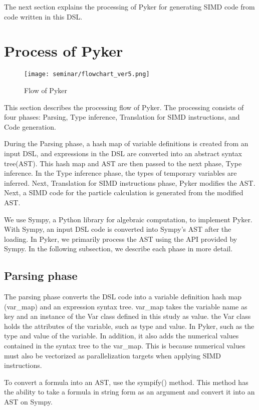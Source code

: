 \documentclass[ams]{article}
\begin{document}
The next section explains the processing of Pyker for generating SIMD code from code written in this DSL.


\section{Process of Pyker}


\begin{figure}[htbp]
\centering
\texttt{[image: seminar/flowchart\_ver5.png]}
\caption{Flow of Pyker}
\label{fig:flowchart}
\end{figure}

This section describes the processing flow of Pyker. The processing consists of four phases: Parsing, Type inference, Translation for SIMD instructions, and Code generation.


During the Parsing phase, a hash map of variable definitions is created from an input DSL, and expressions in the DSL are converted into an abstract syntax tree(AST). This hash map and AST are then passed to the next phase, Type inference. In the Type inference phase, the types of temporary variables are inferred.
Next, Translation for SIMD instructions phase, Pyker modifies the AST. Next, a SIMD code for the particle calculation is generated from the modified AST.


We use Sympy, a Python library for algebraic computation, to implement Pyker. With Sympy, an input DSL code is converted into Sympy's AST after the loading. In Pyker, we primarily process the AST using the API provided by Sympy.
In the following subsection, we describe each phase in more detail.



\subsection{Parsing phase}
The parsing phase converts the DSL code into a variable definition hash map (var\_map) and an expression syntax tree.
var\_map takes the variable name as key and an instance of the Var class defined in this study as value. the Var class holds the attributes of the variable, such as type and value. In Pyker, such as the type and value of the variable.
In addition, it also adds the numerical values contained in the syntax tree to the var\_map. This is because numerical values must also be vectorized as parallelization targets when applying SIMD instructions.


 To convert a formula into an AST, use the sympify() method. This method has the ability to take a formula in string form as an argument and convert it into an AST on Sympy.
 
\end{document}
